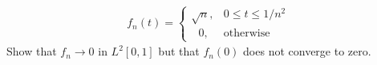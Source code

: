 \begin{questions}

\begin{solution}
\begin{align*}
f_n(t)=\begin{cases} 
   \sqrt{n}, & 0\leq t\leq 1/n^2 \\
       ~~~0, & \text{otherwise}
\end{cases}
\end{align*}
Show that $f_n\rightarrow 0$ in $L^2[0,1]$ but that $f_n(0)$ does not converge to zero.
\end{solution}
\end{questions}
